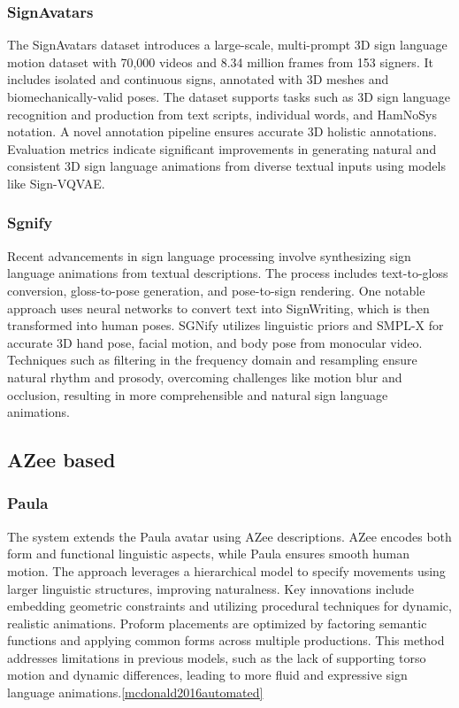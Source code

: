 \documentclass[../../main.tex]{subfiles}
\begin{document}
\subsubsection{SignAvatars}

The SignAvatars dataset introduces a large-scale, multi-prompt 3D sign language motion dataset with 70,000 videos and 8.34 million frames from 153 signers. It includes isolated and continuous signs, annotated with 3D meshes and biomechanically-valid poses. The dataset supports tasks such as 3D sign language recognition and production from text scripts, individual words, and HamNoSys notation. A novel annotation pipeline ensures accurate 3D holistic annotations. Evaluation metrics indicate significant improvements in generating natural and consistent 3D sign language animations from diverse textual inputs using models like Sign-VQVAE.

\subsubsection{Sgnify}

Recent advancements in sign language processing involve synthesizing sign language animations from textual descriptions. The process includes text-to-gloss conversion, gloss-to-pose generation, and pose-to-sign rendering. One notable approach uses neural networks to convert text into SignWriting, which is then transformed into human poses. SGNify utilizes linguistic priors and SMPL-X for accurate 3D hand pose, facial motion, and body pose from monocular video. Techniques such as filtering in the frequency domain and resampling ensure natural rhythm and prosody, overcoming challenges like motion blur and occlusion, resulting in more comprehensible and natural sign language animations.

\subsection{AZee based}

\subsubsection{Paula}

The system extends the Paula\cite{azee-paula} avatar using AZee descriptions. AZee encodes both form and functional linguistic aspects, while Paula ensures smooth human motion. The approach leverages a hierarchical model to specify movements using larger linguistic structures, improving naturalness. Key innovations include embedding geometric constraints and utilizing procedural techniques for dynamic, realistic animations. Proform placements are optimized by factoring semantic functions and applying common forms across multiple productions. This method addresses limitations in previous models, such as the lack of supporting torso motion and dynamic differences, leading to more fluid and expressive sign language animations.\ref{mcdonald2016automated}
\end{document}
